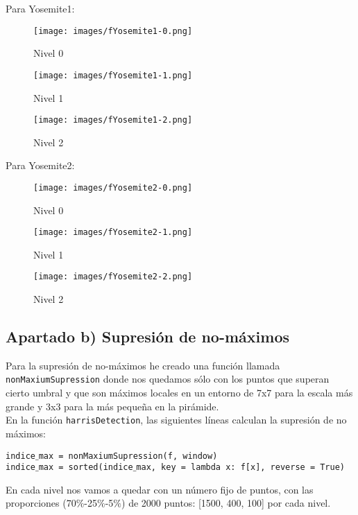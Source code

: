 \documentclass[12pt]{article}
\begin{document}
Para Yosemite1:\\
\begin{figure}[H]
\centering
\parbox{8cm}{
\texttt{[image: images/fYosemite1-0.png]}
\caption{Nivel 0}
\label{fig:3figsA}}
\begin{minipage}{5cm}
\texttt{[image: images/fYosemite1-1.png]}
\caption{Nivel 1}
\label{fig:3figsB}
\end{minipage}
\begin{minipage}{3cm}
\texttt{[image: images/fYosemite1-2.png]}
\caption{Nivel 2}
\label{fig:3figsC}
\end{minipage}
\end{figure}
Para Yosemite2:\\
\begin{figure}[H]
\centering
\parbox{8cm}{
\texttt{[image: images/fYosemite2-0.png]}
\caption{Nivel 0}
\label{fig:3figsA}}
\begin{minipage}{5cm}
\texttt{[image: images/fYosemite2-1.png]}
\caption{Nivel 1}
\label{fig:3figsB}
\end{minipage}
\begin{minipage}{3cm}
\texttt{[image: images/fYosemite2-2.png]}
\caption{Nivel 2}
\label{fig:3figsC}
\end{minipage}
\end{figure}

\subsection*{Apartado b) Supresión de no-máximos}
Para la supresión de no-máximos he creado una función llamada \texttt{nonMaxiumSupression} donde nos quedamos sólo con los puntos que superan cierto umbral y que son máximos locales en un entorno de 7x7 para la escala más grande y 3x3 para la más pequeña en la pirámide.\\
En la función \texttt{harrisDetection}, las siguientes líneas calculan la supresión de no máximos:
\begin{center}
\texttt{indice$\_$max = nonMaxiumSupression(f, window)}\\
\texttt{indice$\_$max = sorted(indice$\_$max, key = lambda x: f[x], reverse = True)}
\end{center}
En cada nivel nos vamos a quedar con un número fijo de puntos, con las proporciones (70$\%$-25$\%$-5$\%$) de 2000 puntos: [1500, 400, 100] por cada nivel.
\end{document}
